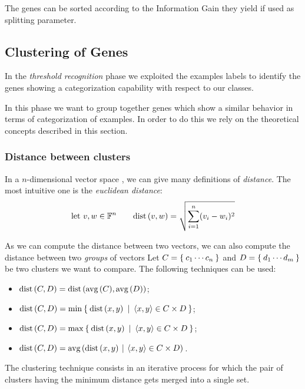         The genes can be sorted according to the Information Gain they
        yield if used as splitting parameter.

\subsection{ Clustering of Genes } \label{sub:Clustering-of-genes}

    In the \emph{threshold recognition} phase we exploited the examples
    labels to identify the genes showing a categorization capability with
    respect to our classes.

    In this phase we want to group together genes which show a similar
    behavior in terms of categorization of examples. In order to do this
    we rely on the theoretical concepts described in this section.

    \subsubsection{ Distance between clusters }

        In a $n$-dimensional vector space \VecFn, we can give
        many definitions of \emph{distance}. The most intuitive one
        is the \emph{euclidean distance}:
        \[
        \mbox{let } v, w \in \mathbb{F}^n \qquad
        \mbox{dist}\left({v},{w}\right) = \sqrt{\sum_{i = 1}^n (v_i - w_i)^2 }
        \]

        As we can compute the distance between two vectors, we can also
        compute the distance between two \emph{groups} of vectors
        Let $C = \Set{ c_1 \cdots c_n }$ and $D = \Set{ d_1 \cdots d_m }$
        be two clusters we want to compare. The following techniques can
        be used:
        \begin{itemize}
        \item   $\mbox{dist}\left({C},{D}\right) = \mbox{dist}\left({\mbox{avg}\left({C}\right)},{\mbox{avg}\left({D}\right)}\right)$;
        \item   $\mbox{dist}\left({C},{D}\right) = \mbox{min}_{}\Set{\mbox{dist}\left({x},{y}\right) \:|\:\ensuremath{\left \langle {x,y} \right \rangle } \in
                                         C \times D}$;
        \item   $\mbox{dist}\left({C},{D}\right) = \mbox{max}_{}\Set{\mbox{dist}\left({x},{y}\right) \:|\:\ensuremath{\left \langle {x,y} \right \rangle } \in
                                         C \times D}$;
        \item   $\mbox{dist}\left({C},{D}\right) = \mbox{avg}\left({\mbox{dist}\left({x},{y}\right) \:|\: \left \langle {x,y} \right \rangle  \in
                                         C \times D}\right){}$.
        \end{itemize}

        The clustering technique consists in an iterative process for
        which the pair of clusters having the minimum distance gets merged
        into a single set.

